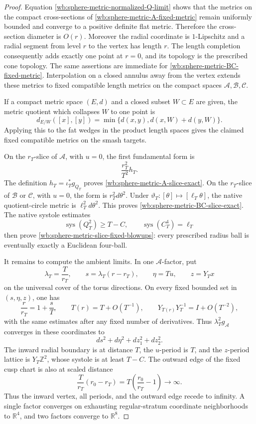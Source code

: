 \begin{proof}
Equation \eqref{wb:sphere-metric-normalized-Q-limit} shows that the metrics on
the compact cross-sections of \eqref{wb:sphere-metric-A-fixed-metric} remain
uniformly bounded and converge to a positive definite flat metric.
Therefore the cross-section diameter is \(O(r)\).  Moreover the radial
coordinate is \(1\)-Lipschitz and a radial segment from level \(r\) to the
vertex has length \(r\).  The length completion consequently adds exactly
one point at \(r=0\), and its topology is the prescribed cone topology.
The same assertions are immediate for
\eqref{wb:sphere-metric-BC-fixed-metric}.  Interpolation on a closed annulus
away from the vertex extends these metrics to fixed compatible length
metrics on the compact spaces \(\mathcal A,\mathcal B,\mathcal C\).

If a compact metric space \((E,d)\) and a closed subset \(W\subset E\) are
given, the metric quotient which collapses \(W\) to one point is
\[
 d_{E/W}([x],[y])
 =\min\{d(x,y),d(x,W)+d(y,W)\}.
\]
Applying this to the fat wedges in the product length spaces gives the
claimed fixed compatible metrics on the smash targets.

On the \(r_T\)-slice of \(\mathcal A\), with \(u=0\), the first fundamental
form is
\[
 \frac{r_T^2}{T^2}h_T.
\]
The definition \(h_T=\iota_T^*g_{Q_T}\) proves
\eqref{wb:sphere-metric-A-slice-exact}.  On the \(r_T\)-slice of
\(\mathcal B\) or \(\mathcal C\), with \(u=0\), the form is
\(r_T^2d\theta^2\).  Under
\(\vartheta_T:[\theta]\mapsto[\ell_T\theta]\), the native quotient-circle
metric is \(\ell_T^2d\theta^2\).  This proves
\eqref{wb:sphere-metric-BC-slice-exact}.  The native systole estimates
\[
 \operatorname{sys}(Q_T^2)\geq T-C,
 \qquad
 \operatorname{sys}(C_T^4)=\ell_T
\]
then prove \eqref{wb:sphere-metric-slice-fixed-blowups}: every prescribed
radius ball is eventually exactly a Euclidean four-ball.

It remains to compute the ambient limits.  In one \(\mathcal A\)-factor,
put
\[
 \lambda_T=\frac{T}{r_T},\qquad
 s=\lambda_T(r-r_T),\qquad
 \eta=Tu,\qquad z=Y_Tx
\]
on the universal cover of the torus directions.  On every fixed bounded
set in \((s,\eta,z)\), one has
\[
 \frac r{r_T}=1+\frac sT,
 \qquad
 T(r)=T+O(T^{-1}),
 \qquad
 Y_{T(r)}Y_T^{-1}=I+O(T^{-2}),
\]
with the same estimates after any fixed number of derivatives.  Thus
\(\lambda_T^2g_{\mathcal A}\) converges in these coordinates to
\[
 ds^2+d\eta^2+dz_1^2+dz_2^2.
\]
The inward radial boundary is at distance \(T\), the \(u\)-period is \(T\),
and the \(z\)-period lattice is \(Y_T\mathbb Z^2\), whose systole is at
least \(T-C\).  The outward edge of the fixed cusp chart is also at scaled
distance
\[
 \frac{T}{r_T}(r_0-r_T)
 =T\left(\frac{r_0}{r_T}-1\right)\longrightarrow\infty.
\]
Thus the inward vertex, all periods, and the outward edge recede to
infinity.  A single factor converges on exhausting regular-stratum
coordinate neighborhoods to \(\mathbb R^4\), and two factors converge to
\(\mathbb R^8\).


\end{proof}
